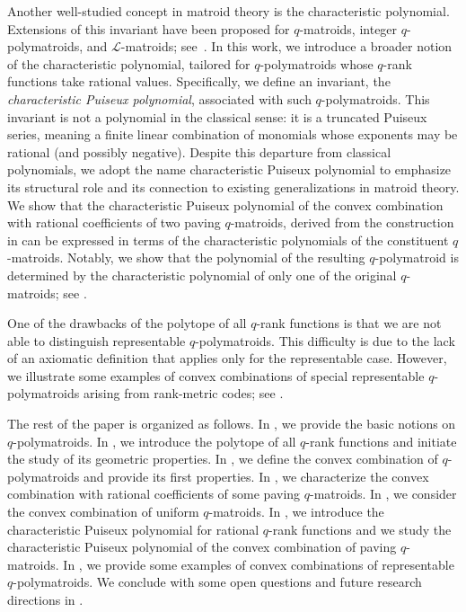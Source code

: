 \documentclass[a4paper,11pt,reqno]{amsart}
\theoremstyle{definition}
\newcommand{\mL}{\mathcal{L}}
\begin{document}
Another well-studied concept in matroid theory is the characteristic polynomial. Extensions of this invariant have been proposed for $q$-matroids, integer $q$-polymatroids, and $\mL$-matroids; see~\cite{jany2023proj_matroid, byrne2024weighted, alfarano2023critical}. In this work, we introduce a broader notion of the characteristic polynomial, tailored for $q$-polymatroids whose $q$-rank functions take rational values. Specifically, we define an invariant, the \emph{characteristic Puiseux polynomial}, associated with such $q$-polymatroids. This invariant is not a polynomial in the classical sense: it is a truncated Puiseux series, meaning a finite linear combination of monomials whose exponents may be rational (and possibly negative). Despite this departure from classical polynomials, we adopt the name characteristic Puiseux polynomial to emphasize its structural role and its connection to existing generalizations in matroid theory.
We show that the characteristic Puiseux polynomial of the convex combination with rational coefficients of two paving $q$-matroids, derived from the construction in \cite{gluesing2022q} can be expressed in terms of the characteristic polynomials of the constituent $q$-matroids. Notably, we show that the polynomial of the resulting $q$-polymatroid is determined by the characteristic polynomial of only one of the original $q$-matroids; see . 

One of the drawbacks of the polytope of all $q$-rank functions is that we are not able to distinguish representable $q$-polymatroids. This difficulty is due to the lack of an axiomatic definition that applies only  for the representable case. However, we illustrate some examples of convex combinations of special representable $q$-polymatroids arising from rank-metric codes; see . 

The rest of the paper is organized as follows. In , we provide the basic notions on $q$-polymatroids. In , we introduce the polytope of all $q$-rank functions and initiate the study of its geometric properties. In , we define the convex combination of $q$-polymatroids and provide its first properties. In , we characterize the convex combination with rational coefficients of some paving $q$-matroids. In , we consider the convex combination of uniform $q$-matroids. In , we introduce the characteristic Puiseux  polynomial for rational $q$-rank functions and we study the characteristic Puiseux polynomial of the convex
combination of paving $q$-matroids. In , we provide some examples of convex combinations of representable $q$-polymatroids. We conclude with some open questions and future research directions in .
\end{document}
